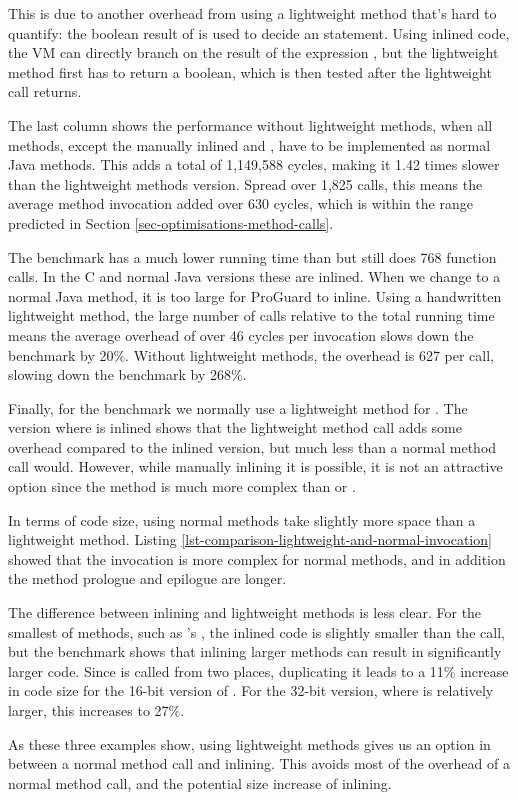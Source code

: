 This is due to another overhead from using a lightweight method that's hard to quantify: the boolean result of  is used to decide an  statement. Using inlined code, the VM can directly branch on the result of the expression , but the lightweight method first has to return a boolean, which is then tested after the lightweight call returns.

The last column shows the performance without lightweight methods, when all methods, except the manually inlined  and , have to be implemented as normal Java methods. This adds a total of 1,149,588 cycles, making it 1.42 times slower than the lightweight methods version. Spread over 1,825 calls, this means the average method invocation added over 630 cycles, which is within the range predicted in Section \ref{sec-optimisations-method-calls}.

The  benchmark has a much lower running time than  but still does 768 function calls. In the C and normal Java versions these are inlined. When we change  to a normal Java method, it is too large for ProGuard to inline. Using a handwritten lightweight method, the large number of calls relative to the total running time means the average overhead of over 46 cycles per invocation slows down the benchmark by 20\%. Without lightweight methods, the overhead is 627 per call, slowing down the benchmark by 268\%.

Finally, for the  benchmark we normally use a lightweight method for . The version where  is inlined shows that the lightweight method call adds some overhead compared to the inlined version, but much less than a normal method call would. However, while manually inlining it is possible, it is not an attractive option since the  method is much more complex than  or .

In terms of code size, using normal methods take slightly more space than a lightweight method. Listing \ref{lst-comparison-lightweight-and-normal-invocation} showed that the invocation is more complex for normal methods, and in addition the method prologue and epilogue are longer.

The difference between inlining and lightweight methods is less clear. For the smallest of methods, such as 's , the inlined code is slightly smaller than the call, but the  benchmark shows that inlining larger methods can result in significantly larger code. Since  is called from two places, duplicating it leads to a 11\% increase in code size for the 16-bit version of . For the 32-bit version, where  is relatively larger, this increases to 27\%.

As these three examples show, using lightweight methods gives us an option in between a normal method call and inlining. This avoids most of the overhead of a normal method call, and the potential size increase of inlining.


